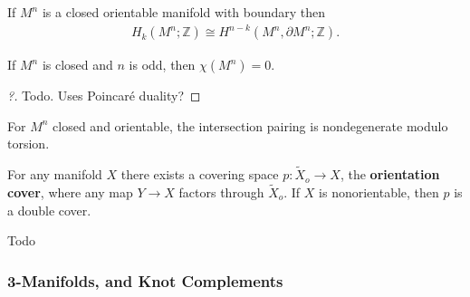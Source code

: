 \begin{proposition}

If \(M^n\) is a closed orientable manifold with boundary then
\begin{align*}
H_k(M^n; {\mathbb{Z}}) \cong H^{n-k}(M^n, {\partial}M^n; {\mathbb{Z}})
.\end{align*}

\end{proposition}

\begin{proposition}

If \(M^n\) is closed and \(n\) is odd, then \(\chi(M^n) = 0\).

\end{proposition}

\begin{proof}[?]

Todo. Uses Poincaré duality?

\end{proof}


\begin{proposition}

For \(M^n\) closed and orientable, the intersection pairing is
nondegenerate modulo torsion.

\end{proposition}

\begin{proposition}

For any manifold \(X\) there exists a covering space
\(p: \tilde X_o\to X\), the \textbf{orientation cover}, where any map
\(Y\to X\) factors through \(\tilde X_o\). If \(X\) is nonorientable,
then \(p\) is a double cover.

\end{proposition}

\begin{theorem}

Todo

\end{theorem}


\hypertarget{manifolds-and-knot-complements}{%
\subsubsection{3-Manifolds, and Knot
Complements}\label{manifolds-and-knot-complements}}

